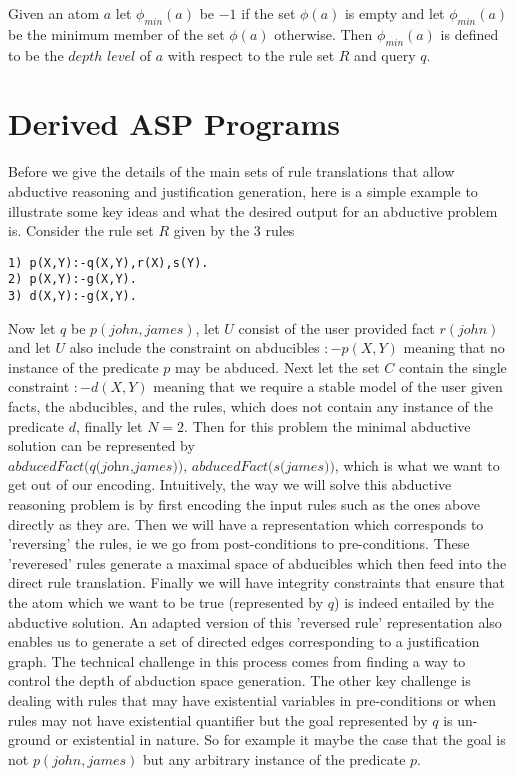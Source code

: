 \documentclass[sigconf]{acmart}
\begin{document}
Given an atom $a$ let $\phi_{min}(a)$ be $-1$ if the set $\phi(a)$ is empty and let $\phi_{min}(a)$ be the minimum member of the set $\phi(a)$ otherwise. Then $\phi_{min}(a)$ is defined to be the $depth$ $level$ of $a$ with respect to the rule set $R$ and query $q$.  

\section{Derived ASP Programs}\label{sec:derived_asp}
Before we give the details of the main sets of rule translations that allow abductive reasoning and justification generation, here is a simple example to illustrate some key ideas and what the desired output for an abductive problem is. Consider the rule set $R$ given by the 3 rules
\begin{verbatim}
1) p(X,Y):-q(X,Y),r(X),s(Y).
2) p(X,Y):-g(X,Y).
3) d(X,Y):-g(X,Y).
\end{verbatim}
Now let $q$ be $p(john,james)$, let $U$ consist of the user provided fact $r(john)$ and let $U$ also include the constraint on abducibles $:-p(X,Y)$ meaning that no instance of the predicate $p$ may be abduced. Next let the set $C$ contain the single constraint $:-d(X,Y)$ meaning that we require a stable model of the user given facts, the abducibles, and the rules, which does not contain any instance of the predicate $d$, finally let $N = 2$. Then for this problem the minimal abductive solution can be represented by $\textit{abducedFact(q(john,james)), abducedFact(s(james))}$, which is what we want to get out of our encoding. Intuitively, the way we will solve this abductive reasoning problem is by first encoding the input rules such as the ones above directly as they are. Then we will have a representation which corresponds to 'reversing' the rules, ie we go from post-conditions to pre-conditions. These 'reveresed' rules generate a maximal space of abducibles which then feed into the direct rule translation. Finally we will have integrity constraints that ensure that the atom which we want to be true (represented by $q$) is indeed entailed by the abductive solution. An adapted version of this 'reversed rule' representation also enables us to generate a set of directed edges corresponding to a justification graph. The technical challenge in this process comes from finding a way to control the depth of abduction space generation. The other key challenge is dealing with rules that may have existential variables in pre-conditions or when rules may not have existential quantifier but the goal represented by $q$ is un-ground or existential in nature. So for example it maybe the case that the goal is not $p(john,james)$ but any arbitrary instance of the predicate $p$.    
\end{document}
